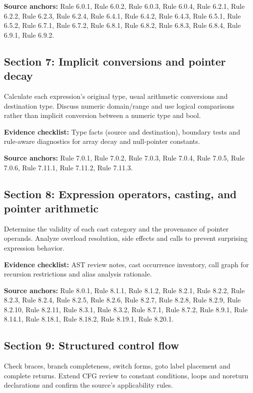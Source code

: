 \documentclass[10pt,letterpaper]{article}
\begin{document}
\textbf{Source anchors:} Rule 6.0.1, Rule 6.0.2, Rule 6.0.3, Rule 6.0.4, Rule 6.2.1, Rule 6.2.2, Rule 6.2.3, Rule 6.2.4, Rule 6.4.1, Rule 6.4.2, Rule 6.4.3, Rule 6.5.1, Rule 6.5.2, Rule 6.7.1, Rule 6.7.2, Rule 6.8.1, Rule 6.8.2, Rule 6.8.3, Rule 6.8.4, Rule 6.9.1, Rule 6.9.2.

\subsection{Section 7: Implicit conversions and pointer decay}
Calculate each expression's original type, usual arithmetic conversions and destination type. Discuss numeric domain/range and use logical comparisons rather than implicit conversion between a numeric type and bool.

\textbf{Evidence checklist:} Type facts (source and destination), boundary tests and rule-aware diagnostics for array decay and null-pointer constants.

\textbf{Source anchors:} Rule 7.0.1, Rule 7.0.2, Rule 7.0.3, Rule 7.0.4, Rule 7.0.5, Rule 7.0.6, Rule 7.11.1, Rule 7.11.2, Rule 7.11.3.

\subsection{Section 8: Expression operators, casting, and pointer arithmetic}
Determine the validity of each cast category and the provenance of pointer operands. Analyze overload resolution, side effects and calls to prevent surprising expression behavior.

\textbf{Evidence checklist:} AST review notes, cast occurrence inventory, call graph for recursion restrictions and alias analysis rationale.

\textbf{Source anchors:} Rule 8.0.1, Rule 8.1.1, Rule 8.1.2, Rule 8.2.1, Rule 8.2.2, Rule 8.2.3, Rule 8.2.4, Rule 8.2.5, Rule 8.2.6, Rule 8.2.7, Rule 8.2.8, Rule 8.2.9, Rule 8.2.10, Rule 8.2.11, Rule 8.3.1, Rule 8.3.2, Rule 8.7.1, Rule 8.7.2, Rule 8.9.1, Rule 8.14.1, Rule 8.18.1, Rule 8.18.2, Rule 8.19.1, Rule 8.20.1.

\subsection{Section 9: Structured control flow}
Check braces, branch completeness, switch forms, goto label placement and complete returns. Extend CFG review to constant conditions, loops and noreturn declarations and confirm the source's applicability rules.
\end{document}
